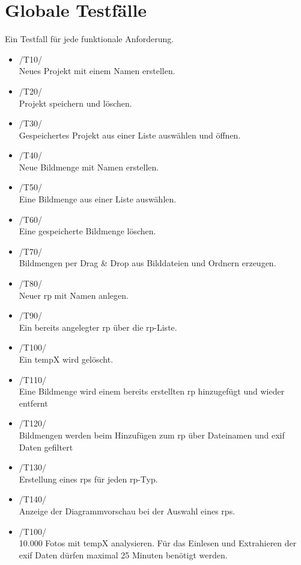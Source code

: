 \section{Globale Testfälle}

Ein Testfall für jede funktionale Anforderung.

\begin{itemize}
	\item /T10/\\ Neues Projekt mit einem Namen erstellen.
	\item /T20/\\ Projekt speichern und löschen.
	\item /T30/\\ Gespeichertes Projekt aus einer Liste auswählen und öffnen.
	\item /T40/\\ Neue Bildmenge mit Namen erstellen.
	\item /T50/\\ Eine Bildmenge aus einer Liste auswählen.
	\item /T60/\\ Eine gespeicherte Bildmenge löschen.
	\item /T70/\\ Bildmengen per Drag & Drop aus Bilddateien und Ordnern erzeugen.
	\item /T80/\\ Neuer \gls{rp} mit Namen anlegen.
	\item /T90/\\ Ein bereits angelegter \gls{rp} über die \gls{rp}-Liste.
	\item /T100/\\ Ein \gls{tempX} wird gelöscht.
	\item /T110/\\ Eine Bildmenge wird einem bereits erstellten \gls{rp} hinzugefügt und wieder entfernt
	\item /T120/\\ Bildmengen werden beim Hinzufügen zum \gls{rp} über Dateinamen und \gls{exif} Daten gefiltert
	\item /T130/\\ Erstellung eines \gls{rp}s für jeden \gls{rp}-Typ.
	\item /T140/\\ Anzeige der Diagrammvorschau bei der Auswahl eines \gls{rp}s. 
	\item /T100/\\ 10.000 Fotos mit \gls{tempX} analysieren. Für das Einlesen und Extrahieren der \gls{exif} Daten dürfen maximal 25 Minuten benötigt werden.
\end{itemize}